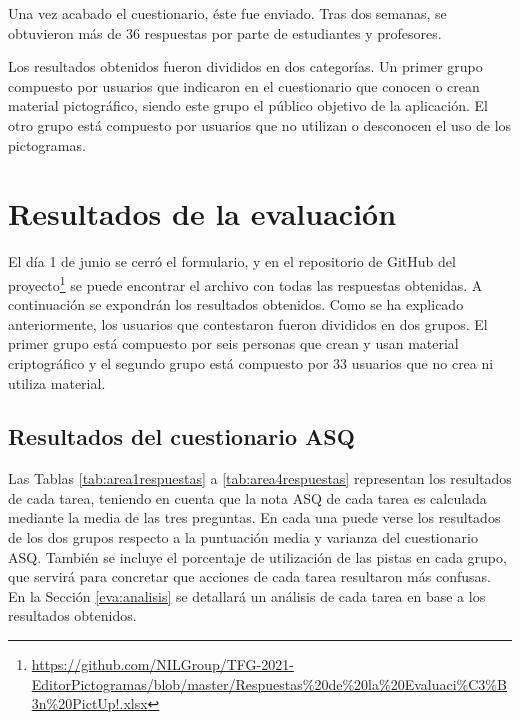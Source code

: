 Una vez acabado el cuestionario, éste fue enviado. Tras dos semanas, se obtuvieron más de 36 respuestas por parte de estudiantes y profesores. 

Los resultados obtenidos fueron divididos en dos categorías. Un primer grupo compuesto por usuarios que indicaron en el cuestionario que conocen o crean material pictográfico, siendo este grupo el público objetivo de la aplicación. El otro grupo está compuesto por usuarios que no utilizan o desconocen el uso de los pictogramas.


\section{Resultados de la evaluación}
\label{eva:res}

El día 1 de junio se cerró el formulario, y en el repositorio de GitHub del proyecto\footnote{\url{https://github.com/NILGroup/TFG-2021-EditorPictogramas/blob/master/Respuestas\%20de\%20la\%20Evaluaci\%C3\%B3n\%20PictUp!.xlsx}} se puede encontrar el archivo con todas las respuestas obtenidas. A continuación se expondrán los resultados obtenidos. Como se ha explicado anteriormente, los usuarios que contestaron fueron divididos en dos grupos. El primer grupo está compuesto por seis personas que crean y usan material criptográfico y el segundo grupo está compuesto por  33 usuarios que no crea ni utiliza material. 

\subsection{Resultados del cuestionario ASQ}
Las Tablas \ref{tab:area1respuestas} a \ref{tab:area4respuestas} representan los resultados de cada tarea, teniendo en cuenta que la nota ASQ de cada tarea es calculada mediante la media de las tres preguntas. En cada una puede verse los resultados de los dos grupos respecto a la puntuación media y varianza del cuestionario ASQ. También se incluye el porcentaje de utilización de las pistas en cada grupo, que servirá para concretar que acciones de cada tarea resultaron más confusas. En la Sección \ref{eva:analisis} se detallará un análisis de cada tarea en base a los resultados obtenidos. 


